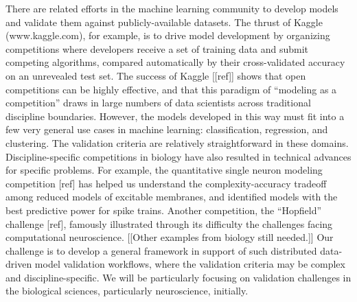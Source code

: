 \documentclass[11pt,letterpaper]{article}
\begin{document}
	There are related efforts in the machine learning community to develop models and validate them against publicly-available datasets.  The thrust of Kaggle (www.kaggle.com), for example, is to drive model development by organizing competitions where developers receive a set of training data and submit competing algorithms, compared automatically by their cross-validated accuracy on an unrevealed test set. The success of Kaggle [[ref]] shows that open competitions can be highly effective, and that this paradigm of ``modeling as a competition'' draws in large numbers of data scientists across traditional discipline boundaries. However, the models developed in this way must fit into a few very general use cases in machine learning: classification, regression, and clustering. The validation criteria are relatively straightforward in these domains. Discipline-specific competitions in biology have also resulted in technical advances for specific problems.  For example, the quantitative single neuron modeling competition [ref] has helped us understand the complexity-accuracy tradeoff among reduced models of excitable membranes, and identified models with the best predictive power for spike trains.  Another competition, the ``Hopfield'' challenge [ref], famously illustrated through its difficulty the challenges facing computational neuroscience.  [[Other examples from biology still needed.]] Our challenge is to develop a general framework in support of such distributed data-driven model validation workflows, where the validation criteria may be complex and discipline-specific. We will be particularly focusing on validation challenges in the biological sciences, particularly neuroscience, initially. 
\end{document}
